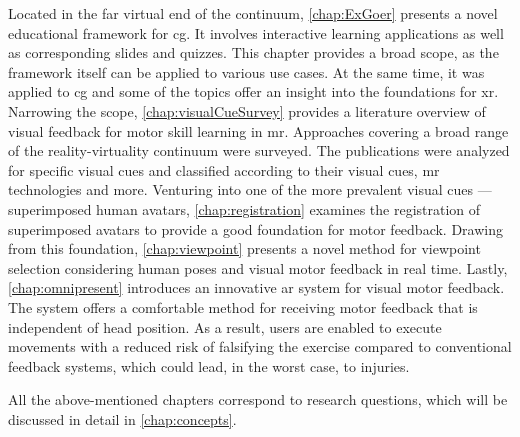 Located in the far virtual end of the continuum, \autoref{chap:ExGoer} presents a novel educational framework for \Acrfull{cg}.
It involves interactive learning applications as well as corresponding slides and quizzes.
This chapter provides a broad scope, as the framework itself can be applied to various use cases.
At the same time, it was applied to \acrshort{cg} and some of the topics offer an insight into the foundations for \acrshort{xr}.
Narrowing the scope, \autoref{chap:visualCueSurvey} provides a literature overview of visual feedback for motor skill learning in \acrshort{mr}.
Approaches covering a broad range of the reality-virtuality continuum were surveyed.
The publications were analyzed for specific visual cues and classified according to their visual cues, \acrshort{mr} technologies and more.
Venturing into one of the more prevalent visual cues --- superimposed human avatars, \autoref{chap:registration} examines the registration of superimposed avatars to provide a good foundation for motor feedback.
Drawing from this foundation, \autoref{chap:viewpoint} presents a novel method for viewpoint selection considering human poses and visual motor feedback in real time.
Lastly, \autoref{chap:omnipresent} introduces an innovative \acrshort{ar} system for visual motor feedback.
The system offers a comfortable method for receiving motor feedback that is independent of head position.
As a result, users are enabled to execute movements with a reduced risk of falsifying the exercise compared to conventional feedback systems, which could lead, in the worst case, to injuries.

All the above-mentioned chapters correspond to research questions, which will be discussed in detail in \autoref{chap:concepts}.


